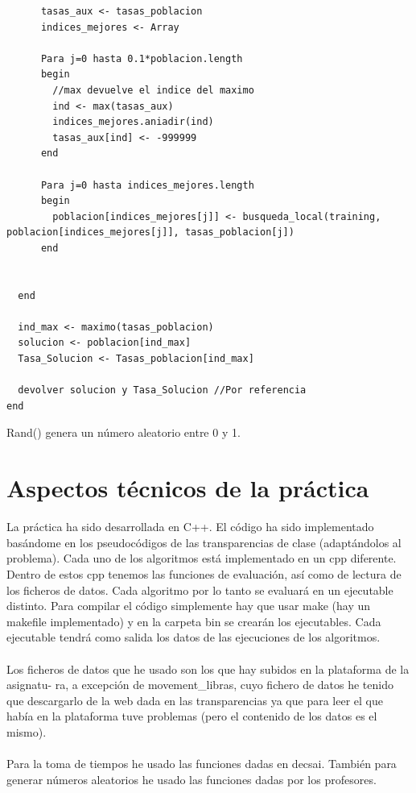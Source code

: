 \begin{lstlisting}
	  tasas_aux <- tasas_poblacion
	  indices_mejores <- Array
	  
      Para j=0 hasta 0.1*poblacion.length
      begin
        //max devuelve el indice del maximo
        ind <- max(tasas_aux)
        indices_mejores.aniadir(ind)
        tasas_aux[ind] <- -999999
      end
      
      Para j=0 hasta indices_mejores.length
      begin
        poblacion[indices_mejores[j]] <- busqueda_local(training, poblacion[indices_mejores[j]], tasas_poblacion[j])
      end
        
      
  end

  ind_max <- maximo(tasas_poblacion)
  solucion <- poblacion[ind_max]
  Tasa_Solucion <- Tasas_poblacion[ind_max]

  devolver solucion y Tasa_Solucion //Por referencia
end
\end{lstlisting}

Rand() genera un número aleatorio entre 0 y 1.
\section{Aspectos técnicos de la práctica}
La práctica ha sido desarrollada en C++. El código ha sido implementado basándome en los
pseudocódigos de las transparencias de clase (adaptándolos al problema). Cada uno de los algoritmos está implementado en un cpp diferente. Dentro de estos cpp tenemos las funciones de
evaluación, así como de lectura de los ficheros de datos. Cada algoritmo por lo tanto se evaluará
en un ejecutable distinto. Para compilar el código simplemente hay que usar make (hay un makefile implementado) y en la carpeta bin se crearán los ejecutables. Cada ejecutable tendrá como
salida los datos de las ejecuciones de los algoritmos.
\\
\\
Los ficheros de datos que he usado son los que hay subidos en la plataforma de la asignatu-
ra, a excepción de movement\_libras, cuyo fichero de datos he tenido que descargarlo de la web
dada en las transparencias ya que para leer el que había en la plataforma tuve problemas (pero
el contenido de los datos es el mismo).
\\
\\
Para la toma de tiempos he usado las funciones dadas en decsai. También para generar números
aleatorios he usado las funciones dadas por los profesores.

